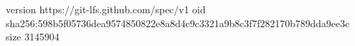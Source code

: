 version https://git-lfs.github.com/spec/v1
oid sha256:598b5f05736dea9574850822e8a8d4c9c3321a9b8c3f7f282170b789dda9ee3c
size 3145904
